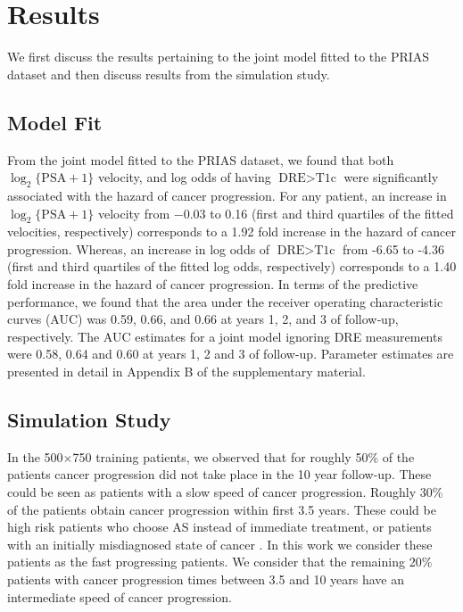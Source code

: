 
\section{Results}
\label{sec:results}
We first discuss the results pertaining to the joint model fitted to the PRIAS dataset and then discuss results from the simulation study.
\subsection{Model Fit}
From the joint model fitted to the PRIAS dataset, we found that both $\log_2 \{\mbox{PSA} + 1\}$ velocity,  and log odds of having $\mbox{DRE} > \mbox{T1c}$  were significantly associated with the hazard of cancer progression. For any patient, an increase in $\log_2 \{\mbox{PSA} + 1\}$ velocity from −0.03 to 0.16 (first and third quartiles of the fitted velocities, respectively) corresponds to a 1.92 fold increase in the hazard of cancer progression. Whereas, an increase in log odds of $\mbox{DRE} > \mbox{T1c}$ from -6.65 to -4.36 (first and third quartiles of the fitted log odds, respectively) corresponds to a 1.40 fold increase in the hazard of cancer progression. In terms of the predictive performance, we found that the area under the receiver operating characteristic curves (AUC) \cite{landmarking2017} was 0.59, 0.66, and 0.66 at years 1, 2, and 3 of follow‐up, respectively. The AUC estimates for a joint model ignoring DRE measurements were 0.58, 0.64 and 0.60 at years 1, 2 and 3 of follow-up. Parameter estimates are presented in detail in Appendix B of the supplementary material.

\subsection{Simulation Study}
In the 500$\times$750 training patients, we observed that for roughly 50\% of the patients cancer progression did not take place in the 10 year follow-up. These could be seen as patients with a slow speed of cancer progression. Roughly 30\% of the patients obtain cancer progression within first 3.5 years. These could be high risk patients who choose AS instead of immediate treatment, or patients with an initially misdiagnosed state of cancer \cite{cooperberg2011outcomes}. In this work we consider these patients as the fast progressing patients. We consider that the remaining 20\% patients with cancer progression times between 3.5 and 10 years have an intermediate speed of cancer progression.

